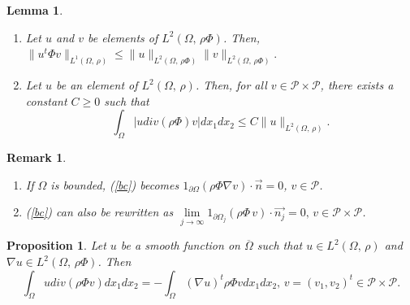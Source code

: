 \documentclass[10pt,a4paper]{amsart}
\newtheorem{lemma}{Lemma}
\newtheorem{remark}{Remark}
\newtheorem{proposition}{Proposition}
\begin{document}
	{\begin{lemma}\label{inlem} \hspace{1cm}\\
			\begin{enumerate}
				\item Let  $u$ and $v$ be elements of $L^2(\Omega,\,\rho\Phi)$. Then, $\|u^t\Phi v\|_{L^1(\Omega,\,\rho)}\leq \|u\|_{L^2(\Omega,\,\rho\Phi)}\|v\|_{L^2(\Omega,\,\rho\Phi)}.$ 
				\item Let $u$ be an element of $L^2(\Omega,\,\rho)$. Then, for all $v\in\mathcal{P}\times\mathcal{P}$, there exists a constant $C\geq 0$ such that  $$\int_{\Omega}|u div(\rho\Phi )v|dx_1dx_2\leq C \| u\|_{L^2(\Omega,\,\rho)}.$$
			\end{enumerate}
		\end{lemma}

	\begin{remark}\label{bcremark}\hspace{1 cm}\\
		\begin{enumerate}
			\item If $\Omega$ is bounded, (\ref{bc}) becomes $1_{\partial\Omega}\left(\rho\Phi\nabla v\right)\cdot\overrightarrow{n}=0$, $v\in\mathcal{P}$.
			\item (\ref{bc}) can also be rewritten as 	$\lim\limits_{j\rightarrow\infty}1_{\partial\Omega_j}\left(\rho \Phi\,v\right)\cdot\overrightarrow{n_j}=0,\, v\in\mathcal{P}\times\mathcal{P}$.
		\end{enumerate}
	\end{remark}

	\begin{proposition}\label{dderiv}
		Let $u$ be a smooth function on $\overline{\Omega}$ such that $u\in L^2(\Omega,\,  \rho)$ and $\nabla u\in L^2(\Omega,\,  \rho\Phi)$. Then
		\begin{equation}\label{dderiv0}
			\int_{\Omega}u div(\rho\Phi v)dx_1dx_2=-\int_{\Omega}(\nabla u)^t\rho\Phi vdx_1dx_2,\,v=(v_1,v_2)^t\in \mathcal{P}\times\mathcal{P}.
		\end{equation}
	\end{proposition}

}
\end{document}
